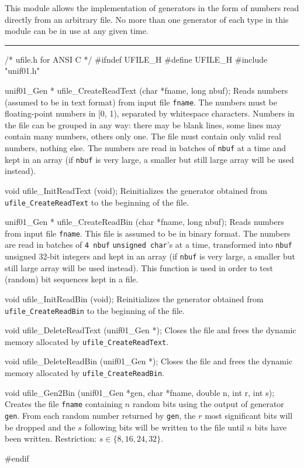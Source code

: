 
This module allows the implementation of generators in the form of numbers
read directly from an arbitrary file. No more than one generator of each
 type in this module can be in use at any given time.


\bigskip
\hrule
\code\hide
/* ufile.h for ANSI C */
#ifndef UFILE_H
#define UFILE_H
\endhide
#include "unif01.h"


unif01_Gen * ufile_CreateReadText (char *fname, long nbuf);
\endcode
  \tab  Reads numbers (assumed to be in text format) from input file
   \texttt{fname}. %
   The numbers must be floating-point numbers in [0, 1), separated by
   whitespace characters. Numbers in the file can be grouped in any way: 
   there may be blank lines, some lines may contain many numbers, others
   only one. The file must contain only valid real numbers, nothing else.
   The numbers are read in batches of {\tt nbuf} at a time and kept in an array
   (if {\tt nbuf} is very large, a smaller but still large array will be used
   instead).
 \endtab
\code


void ufile_InitReadText (void);
\endcode
  \tab Reinitializes the generator obtained from {\tt ufile\_CreateReadText}
   to the beginning of the file.
  \endtab
\code


unif01_Gen * ufile_CreateReadBin (char *fname, long nbuf);
\endcode
  \tab  Reads numbers from input file \texttt{fname}. This file is assumed
   to be in binary format. The numbers are read in batches of {\tt 4 nbuf}
  \texttt{unsigned char}'s at a time, transformed into  {\tt nbuf}  unsigned
   32-bit integers and kept in an array (if {\tt nbuf} is very large, a
    smaller but still large array will be used instead).
   This function is used in order to test (random) 
   bit sequences kept in a file.
  \endtab
\code


void ufile_InitReadBin (void);
\endcode
  \tab Reinitializes the generator obtained from {\tt ufile\_CreateReadBin}
   to the beginning of the file.
  \endtab


\code

void ufile_DeleteReadText (unif01_Gen *);
\endcode
  \tab Closes the file and frees the dynamic memory allocated by 
  \texttt{ufile\_CreateReadText}.
  \endtab
\code


void ufile_DeleteReadBin (unif01_Gen *);
\endcode
  \tab Closes the file and frees the dynamic memory allocated by 
  \texttt{ufile\_CreateReadBin}.
  \endtab


\code

void ufile_Gen2Bin (unif01_Gen *gen, char *fname, double n, int r, int s);
\endcode
  \tab Creates the file {\tt fname} containing $n$ random bits using the
  output of generator {\tt gen}. From each random number 
  returned by {\tt gen}, the $r$ most significant bits will be dropped
  and the $s$ following bits will be written to the file until $n$ bits
  have been written. Restriction: $s \in \{ 8, 16, 24, 32 \}$. 
  \endtab

\code
\hide
#endif
\endhide
\endcode
